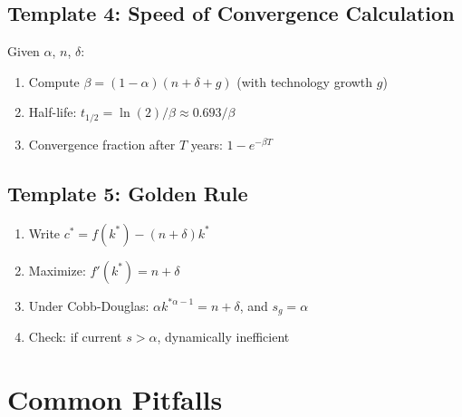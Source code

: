 \documentclass[a4paper,11pt]{article}
\begin{document}
\subsection*{Template 4: Speed of Convergence Calculation}

Given $\alpha$, $n$, $\delta$:
\begin{enumerate}
    \item Compute $\beta = (1-\alpha)(n+\delta+g)$ (with technology growth $g$)
    \item Half-life: $t_{1/2} = \ln(2)/\beta \approx 0.693/\beta$
    \item Convergence fraction after $T$ years: $1 - e^{-\beta T}$
\end{enumerate}

\subsection*{Template 5: Golden Rule}

\begin{enumerate}
    \item Write $c^* = f(k^*) - (n+\delta)k^*$
    \item Maximize: $f'(k^*) = n+\delta$
    \item Under Cobb-Douglas: $\alpha k^{*\alpha-1} = n+\delta$, and $s_g = \alpha$
    \item Check: if current $s > \alpha$, dynamically inefficient
\end{enumerate}

\section{Common Pitfalls}
\end{document}
